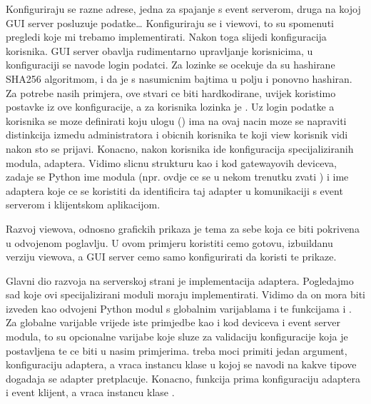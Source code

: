 \documentclass[letterpaper,10pt,croatian]{sphinxmanual}
\begin{document}
\sphinxAtStartPar
Konfiguriraju se razne adrese, jedna za spajanje s event serverom, druga na
kojoj GUI server posluzuje podatke… Konfiguriraju se i viewovi, to su
spomenuti pregledi koje mi trebamo implementirati. Nakon toga slijedi
konfiguracija korisnika. GUI server obavlja rudimentarno upravljanje
korisnicima, u konfiguraciji se navode login podatci. Za lozinke se ocekuje da
su hashirane SHA256 algoritmom, i da je  s nasumicnim bajtima u
 polju i ponovno hashiran. Za potrebe nasih primjera, ove stvari ce
biti hardkodirane, uvijek koristimo postavke iz ove konfiguracije, a za
korisnika  lozinka je . Uz login podatke a korisnika se moze
definirati koju ulogu () ima \sphinxhyphen{} na ovaj nacin moze se napraviti
distinkcija izmedu administratora i obicnih korisnika te koji view korisnik
vidi nakon sto se prijavi. Konacno, nakon korisnika ide konfiguracija
specijaliziranih modula, adaptera. Vidimo slicnu strukturu kao i kod
gatewayovih deviceva, zadaje se Python ime modula (npr. ovdje ce se u nekom
trenutku zvati ) i ime adaptera koje ce se koristiti
da identificira taj adapter u komunikaciji s event serverom i klijentskom
aplikacijom.

\sphinxAtStartPar
Razvoj viewova, odnosno grafickih prikaza je tema za sebe koja ce biti
pokrivena u odvojenom poglavlju. U ovom primjeru koristiti cemo gotovu,
izbuildanu verziju viewova, a GUI server cemo samo konfigurirati da koristi te
prikaze.

\sphinxAtStartPar
Glavni dio razvoja na serverskoj strani je implementacija adaptera. Pogledajmo
sad 
koje ovi specijalizirani moduli moraju implementirati. Vidimo da on mora biti
izveden kao odvojeni Python modul s globalnim varijablama  i
 te funkcijama  i
. Za globalne varijable vrijede iste primjedbe kao i kod
deviceva i event server modula, to su opcionalne varijabe koje sluze za
validaciju konfiguracije koja je postavljena te ce biti  u nasim
primjerima.  treba moci primiti jedan argument,
konfiguraciju adaptera, a vraca instancu 
klase u kojoj se navodi na kakve tipove dogadaja se adapter pretplacuje.
Konacno,  funkcija prima konfiguraciju adaptera i event
klijent, a vraca instancu klase .
\end{document}

